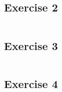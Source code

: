 \documentclass{article}
\begin{document}
    \subsection{Exercise 2}\label{sec:RE2}
      \begin{lstlisting}[language=R]
      \end{lstlisting}
    \subsection{Exercise 3}\label{sec:RE3}
      \begin{lstlisting}[language=R]
      \end{lstlisting}
    \subsection{Exercise 4}\label{sec:RE4}
      \begin{lstlisting}[language=R]
      \end{lstlisting}
\end{document}
